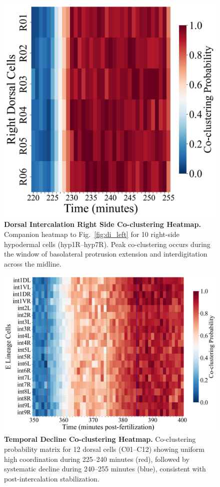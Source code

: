 \documentclass[unnumsec,webpdf,modern,large,namedate]{oup-authoring-template}%
\theoremstyle{thmstyleone}\newtheorem{theorem}{Theorem}
\theoremstyle{thmstyletwo}\newtheorem{example}{Example}
\theoremstyle{thmstylethree}\newtheorem{definition}{Definition}
\begin{document}
\begin{figure}[t]
  \centering
  \includegraphics[width=\linewidth]{Demo1B_Dorsal_Right_Coclustering_Heatmap.png}
  \caption{\textbf{Dorsal Intercalation Right Side Co-clustering Heatmap.} Companion heatmap to Fig.~\ref{fig:di_left} for 10 right-side hypodermal cells (hyp1R--hyp7R). Peak co-clustering occurs during the window of basolateral protrusion extension and interdigitation across the midline.}
  \label{fig:di_right}
\end{figure}



\begin{figure}[t]
  \centering
  \includegraphics[width=\linewidth]{Demo4_Intestinal_Coclustering_Heatmap.png}
  \caption{\textbf{Temporal Decline Co-clustering Heatmap.} Co-clustering probability matrix for 12 dorsal cells (C01--C12) showing uniform high coordination during 225--240 minutes (red), followed by systematic decline during 240--255 minutes (blue), consistent with post-intercalation stabilization.}
  \label{fig:decline}
\end{figure}
\end{document}
